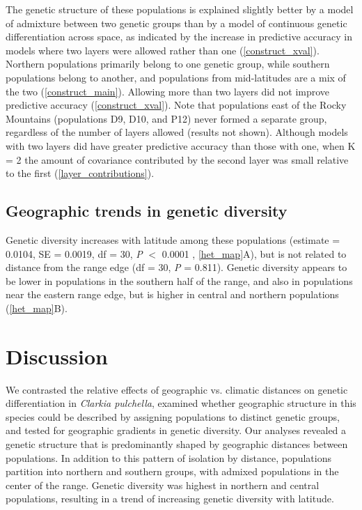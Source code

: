 \documentclass{article}
\begin{document}
The genetic structure of these populations is explained slightly better by a model of admixture between two genetic groups than by a model of continuous genetic differentiation across space, as indicated by the increase in predictive accuracy in models where two layers were allowed rather than one (\autoref{construct_xval}). Northern populations primarily belong to one genetic group, while southern populations belong to another, and populations from mid-latitudes are a mix of the two (\autoref{construct_main}). Allowing more than two layers did not improve predictive accuracy (\autoref{construct_xval}). Note that populations east of the Rocky Mountains (populations D9, D10, and P12) never formed a separate group, regardless of the number of layers allowed (results not shown). Although models with two layers did have greater predictive accuracy than those with one, when K = 2 the amount of covariance contributed by the second layer was small relative to the first (\autoref{layer_contributions}). 

\subsection*{Geographic trends in genetic diversity}

Genetic diversity increases with latitude among these populations (estimate = 0.0104, SE = 0.0019, df = 30, \textit{P} $<$ 0.0001 , \autoref{het_map}A), but is not related to distance from the range edge (df = 30, \textit{P} = 0.811). Genetic diversity appears to be lower in populations in the southern half of the range, and also in populations near the eastern range edge, but is higher in central and northern populations (\autoref{het_map}B). 

\section*{Discussion}

We contrasted the relative effects of geographic vs. climatic distances on genetic differentiation in \textit{Clarkia pulchella}, examined whether geographic structure in this species could be described by assigning populations to distinct genetic groups, and tested for geographic gradients in genetic diversity. Our analyses revealed a genetic structure that is predominantly shaped by geographic distances between populations. In addition to this pattern of isolation by distance, populations partition into northern and southern groups, with admixed populations in the center of the range. Genetic diversity was highest in northern and central populations, resulting in a trend of increasing genetic diversity with latitude.
\end{document}
